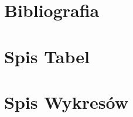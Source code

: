 \documentclass[12pt]{article}
\begin{document}
	{
		\newpage
		\section{Bibliografia}
		\printbibliography[heading=none]
	}

	{
		\newpage
		\section{Spis Tabel}
		\listoftables
		\thispagestyle{fancy}
		\newpage
	}

	{
		\newpage
		\section{Spis Wykresów}
		\listoffigures
		\thispagestyle{fancy}
		\newpage
	}
\end{document}
